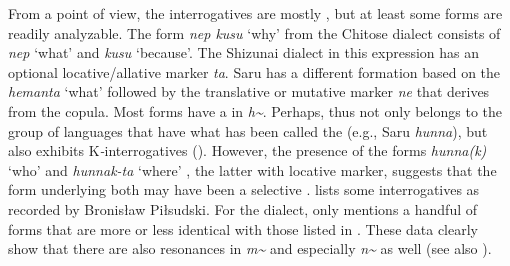 From a  point of view, the interrogatives are mostly , but at least some forms are readily analyzable. The form \textit{nep kusu} ‘why’ from the Chitose dialect consists of \textit{nep} ‘what’ and \textit{kusu} ‘because’. The Shizunai dialect in this expression has an optional locative/allative  marker \textit{ta}. Saru has a different formation based on the  \textit{hemanta} ‘what’ followed by the translative \citep[36]{Shibatani1990} or mutative \citep[476]{Bugaeva2012} marker \textit{ne} that derives from the copula. Most forms have a  in \textit{h{\textasciitilde}}. Perhaps,  thus not only belongs to the group of languages that have what has been called the  (e.g., Saru \textit{hunna}), but also exhibits K\textit{-}interrogatives (). However, the presence of the forms \textit{hunna(k)} ‘who’ and \textit{hunnak-ta} ‘where’ \citep{Batchelor1905}, the latter with locative  marker, suggests that the form underlying both may have been a selective .  lists some   interrogatives as recorded by Bronisław Piłsudski. For the  dialect, \citet[77]{Tittel1922} only mentions a handful of forms that are more or less identical with those listed in . These data clearly show that there are also resonances in \textit{m{\textasciitilde}} and especially \textit{n{\textasciitilde}} as well (see also \citealt{Batchelor1905}).






